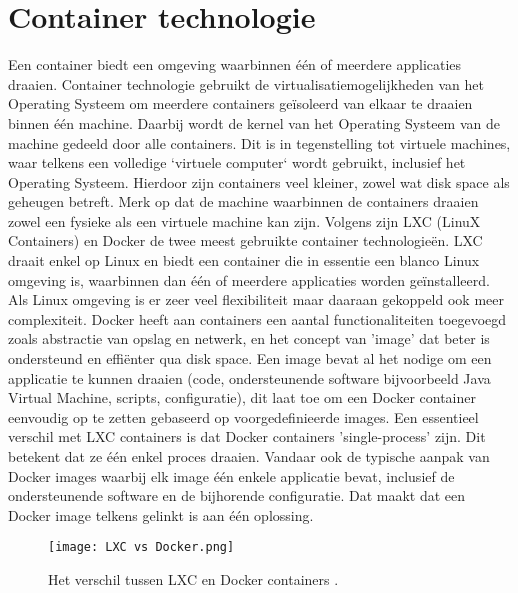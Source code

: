 \section{Container technologie}
Een container biedt een omgeving waarbinnen één of meerdere applicaties draaien. Container technologie gebruikt de virtualisatiemogelijkheden van het Operating Systeem om meerdere containers geïsoleerd van elkaar te draaien binnen \'e\'en machine. Daarbij wordt de kernel van het Operating Systeem van de machine gedeeld door alle containers.
\newline
Dit is in tegenstelling tot virtuele machines, waar telkens een volledige `virtuele computer` wordt gebruikt, inclusief het Operating Systeem. Hierdoor zijn containers veel kleiner, zowel wat disk space als geheugen betreft.
\newline
Merk op dat de machine waarbinnen de containers draaien zowel een fysieke als een virtuele machine kan zijn.
\newline
Volgens \textcite{Moravcik2020} zijn LXC (LinuX Containers) en Docker de twee meest gebruikte container technologieën.
\newline
LXC draait enkel op Linux en biedt een container die in essentie een blanco Linux omgeving is, waarbinnen dan \'e\'en of meerdere applicaties worden geïnstalleerd. Als Linux omgeving is er zeer veel flexibiliteit maar daaraan gekoppeld ook meer complexiteit.
\newline
Docker heeft aan containers een aantal functionaliteiten toegevoegd zoals abstractie van opslag en netwerk, en het concept van 'image' dat beter is ondersteund en effiënter qua disk space. Een image bevat al het nodige om een applicatie te kunnen draaien (code, ondersteunende software bijvoorbeeld Java Virtual Machine, scripts, configuratie), dit laat toe om een Docker container eenvoudig op te zetten gebaseerd op voorgedefinieerde images.
\newline
Een essentieel verschil met LXC containers is dat Docker containers 'single-process' zijn. Dit betekent dat ze \'e\'en enkel proces draaien. Vandaar ook de typische aanpak van Docker images waarbij elk image \'e\'en enkele applicatie bevat, inclusief de ondersteunende software en de bijhorende configuratie. Dat maakt dat een Docker image telkens gelinkt is aan \'e\'en oplossing.
\newline
\begin{figure}[H]
    \texttt{[image: LXC vs Docker.png]}
    \caption{Het verschil tussen LXC en Docker containers \autocite{Kahuha2023}.}
\end{figure}

